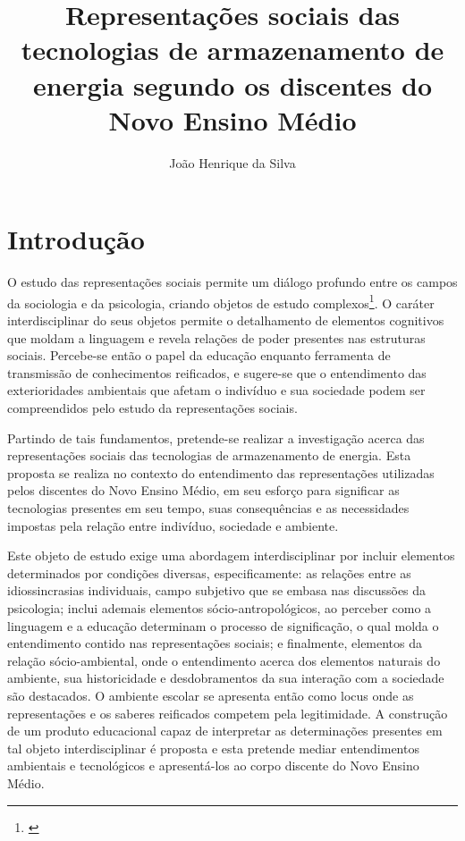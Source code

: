 \documentclass[
   article,       %
   12pt,          %
   oneside,       %
   a4paper,       %
   english,       %
   brazil,           %
   sumario=tradicional
   ]{abntex2}
\title{Representações sociais das tecnologias de armazenamento de energia segundo os discentes do Novo Ensino Médio}
\author{João Henrique da Silva}
\begin{document}

\frenchspacing 

\maketitle

\newpage

\textual

\section{Introdução}

O estudo das representações sociais permite um diálogo profundo entre os campos da sociologia e da psicologia, criando objetos de estudo complexos\footnote{\cite[p.35]{Interdisciplinar_Complexidade}}. O caráter interdisciplinar do seus objetos permite o detalhamento de elementos cognitivos que moldam a linguagem e revela relações de poder presentes nas estruturas sociais. Percebe-se então o papel da educação enquanto ferramenta de transmissão de conhecimentos reificados, e sugere-se que o entendimento das exterioridades ambientais que afetam o indivíduo e sua sociedade podem ser compreendidos pelo estudo da representações sociais.

Partindo de tais fundamentos, pretende-se realizar a investigação acerca das representações sociais das tecnologias de armazenamento de energia. Esta proposta se realiza no contexto do entendimento das representações utilizadas pelos discentes do Novo Ensino Médio, em seu esforço para significar as tecnologias presentes em seu tempo, suas consequências e as necessidades impostas pela relação entre indivíduo, sociedade e ambiente. 

Este objeto de estudo exige uma abordagem interdisciplinar por incluir elementos determinados por condições diversas, especificamente: as relações entre as idiossincrasias individuais, campo subjetivo que se embasa nas discussões da psicologia; inclui ademais elementos sócio-antropológicos, ao perceber como a linguagem e a educação determinam o processo de significação, o qual molda o entendimento contido nas representações sociais; e finalmente, elementos da relação sócio-ambiental, onde o entendimento acerca dos elementos naturais do ambiente, sua historicidade e desdobramentos da sua interação com a sociedade são destacados. O ambiente escolar se apresenta então como locus onde as representações e os saberes reificados competem pela legitimidade. A construção de um produto educacional capaz de interpretar as determinações presentes em tal objeto interdisciplinar é proposta e esta pretende mediar entendimentos ambientais e tecnológicos e apresentá-los ao corpo discente do Novo Ensino Médio.
\end{document}
